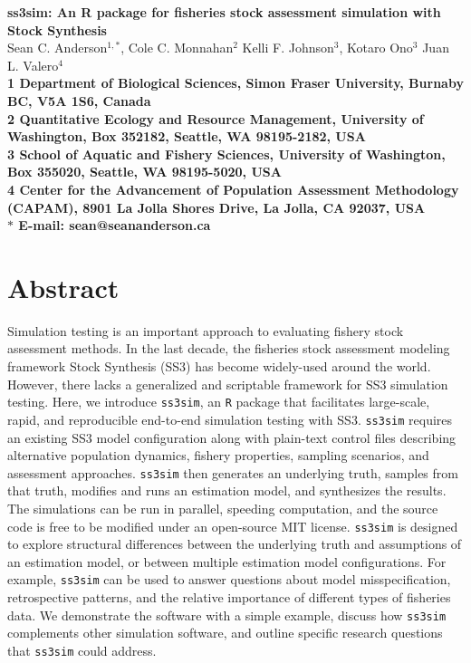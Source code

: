 \documentclass[12pt]{article}
\date{}
\begin{document}
\begin{flushleft}
{\Large
\textbf{ss3sim: An R package for fisheries stock assessment simulation with Stock Synthesis}
}
\\
Sean C. Anderson$^{1,\ast}$,
Cole C. Monnahan$^{2}$
Kelli F. Johnson$^{3}$,
Kotaro Ono$^{3}$
Juan L. Valero$^{4}$
\\
\bf{1} Department of Biological Sciences,
Simon Fraser University,
Burnaby BC, V5A 1S6, Canada
\\
\bf{2} Quantitative Ecology and Resource Management,
University of Washington, Box 352182,
Seattle, WA 98195-2182, USA
\\
\bf{3} School of Aquatic and Fishery Sciences,
University of Washington, Box 355020,
Seattle, WA 98195-5020, USA
\\
\bf{4} Center for the Advancement of Population Assessment Methodology
(CAPAM), 8901 La Jolla Shores Drive, La Jolla, CA 92037, USA
\\
$\ast$ E-mail: sean@seananderson.ca
\end{flushleft}



\section*{Abstract}

Simulation testing is an important approach to evaluating fishery stock assessment methods. In the last decade, the fisheries stock assessment modeling framework Stock Synthesis (SS3) has become widely-used around the world. However, there lacks a generalized and scriptable framework for SS3 simulation testing. Here, we introduce \texttt{ss3sim}, an \texttt{R} package that facilitates large-scale, rapid, and reproducible end-to-end simulation testing with SS3. \texttt{ss3sim} requires an existing SS3 model configuration along with plain-text control files describing alternative population dynamics, fishery properties, sampling scenarios, and assessment approaches. \texttt{ss3sim} then generates an underlying truth, samples from that truth, modifies and runs an estimation model, and synthesizes the results. The simulations can be run in parallel, speeding computation, and the source code is free to be modified under an open-source MIT license. \texttt{ss3sim} is designed to explore structural differences between the underlying truth and assumptions of an estimation model, or between multiple estimation model configurations. For example, \texttt{ss3sim} can be used to answer questions about model misspecification, retrospective patterns, and the relative importance of different types of fisheries data. We demonstrate the software with a simple example, discuss how \texttt{ss3sim} complements other simulation software, and outline specific research questions that \texttt{ss3sim} could address.
\end{document}
